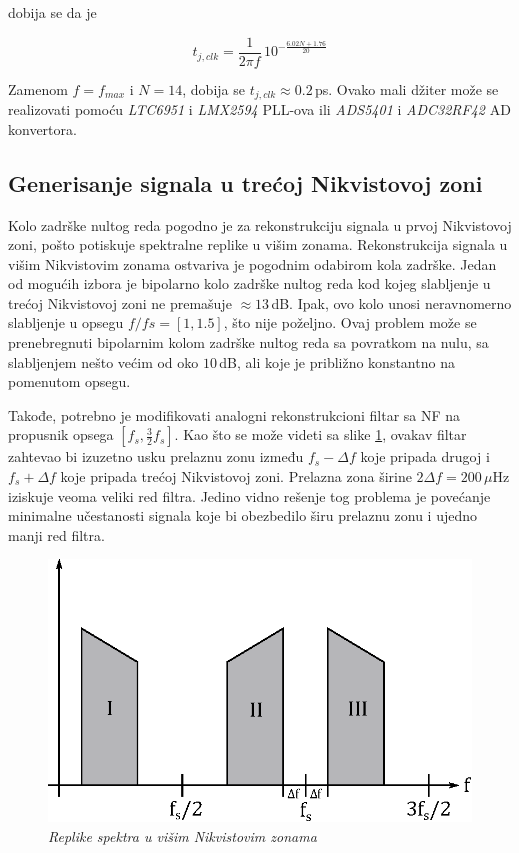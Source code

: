 \documentclass[conference]{IEEEtran}
\begin{document}
\noindent dobija se da je 

\begin{equation}
t_{j,clk} = \frac{1}{2\pi f}\,10^{-\frac{6.02N + 1.76}{20}} 
\end{equation}

Zamenom $f=f_{max}$ i $N=14$, dobija se $t_{j,clk}\approx 0.2$\,ps. Ovako mali džiter može se realizovati pomoću \textsl{LTC6951} i \textsl{LMX2594} PLL-ova ili \textsl{ADS5401} i \textsl{ADC32RF42} AD konvertora. 

\subsection{Generisanje signala u trećoj Nikvistovoj zoni}
Kolo zadrške nultog reda pogodno je za rekonstrukciju signala u prvoj Nikvistovoj zoni, pošto potiskuje spektralne replike u višim zonama. Rekonstrukcija signala u višim Nikvistovim zonama ostvariva je pogodnim odabirom kola zadrške. Jedan od mogućih izbora je bipolarno kolo zadrške nultog reda kod kojeg slabljenje u trećoj Nikvistovoj zoni ne premašuje $\approx 13$\,dB. Ipak, ovo kolo unosi neravnomerno slabljenje u opsegu $f/fs = [1, 1.5]$, što nije poželjno. Ovaj problem može se prenebregnuti bipolarnim kolom zadrške nultog reda sa povratkom na nulu, sa slabljenjem nešto većim od oko $10$\,dB, ali koje je približno konstantno na pomenutom opsegu.

Takođe, potrebno je modifikovati analogni rekonstrukcioni filtar sa NF na propusnik opsega $[f_s, \frac{3}{2}f_s]$. Kao što se može videti sa slike \ref{slika:nikvist}, ovakav filtar zahtevao bi izuzetno usku prelaznu zonu između $f_s-\Delta f$ koje pripada drugoj i $f_s+\Delta f$ koje pripada trećoj Nikvistovoj zoni. Prelazna zona širine $2\Delta f = 200\,\mu$Hz iziskuje veoma veliki red filtra. Jedino vidno rešenje tog problema je povećanje minimalne učestanosti signala koje bi obezbedilo širu prelaznu zonu i ujedno manji red filtra.

\begin{figure}[h]
	\centering
	\includegraphics[scale=0.7]{./slike/nikvist.eps}
	\caption{\textsl{Replike spektra u višim Nikvistovim zonama}}
	\label{slika:nikvist}
\end{figure}
\end{document}
